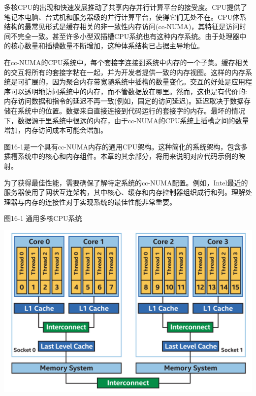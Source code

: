 多核CPU的出现和快速发展推动了共享内存并行计算平台的接受度。CPU提供了笔记本电脑、台式机和服务器级的并行计算平台，使得它们无处不在。CPU体系结构的最常见形式是缓存相关的非一致性内存访问(cc-NUMA)，其特征是访问时间不完全一致。甚至许多小型双插槽CPU系统也有这种内存系统。由于处理器中的核心数量和插槽数量不断增加，这种体系结构已占据主导地位。\par

在cc-NUMA的CPU系统中，每个套接字连接到系统中内存的一个子集。缓存相关的交互将所有的套接字粘在一起，并为开发者提供一致的内存视图。这样的内存系统是可扩展的，因为聚合内存带宽随系统中插槽的数量变化。交互的好处是应用程序可以透明地访问系统中的内存，而不管数据放在哪里。然而，这也是有代价的:内存访问数据和指令的延迟不再一致(例如，固定的访问延迟)。延迟取决于数据存储在系统中的位置。数据来自直接连接到代码运行的套接字的内存。最坏的情况下，数据源于里系统中很远的内存，由于cc-NUMA的CPU系统上插槽之间的数量增加，内存访问成本可能会增加。\par

图16-1是一个具有cc-NUMA内存的通用CPU架构。这种简化的系统架构，包含多插槽系统中的核心和内存组件。本章的其余部分，将用来说明对应代码示例的映射。\par

为了获得最佳性能，需要确保了解特定系统的cc-NUMA配置。例如，Intel最近的服务器使用了网状互连架构，其中核心、缓存和内存控制器组织成行和列。理解处理器与内存的连接性对于实现系统的最佳性能非常重要。\par

\hspace*{\fill} \par %
图16-1 通用多核CPU系统
\begin{center}
	\includegraphics[width=1.0\textwidth]{content/chapter-16/images/2}
\end{center}

